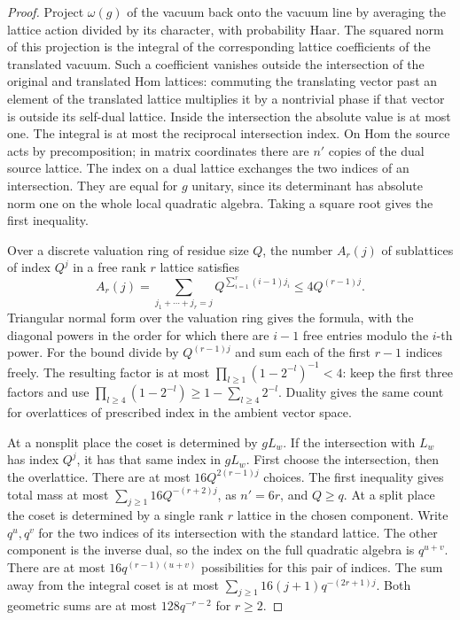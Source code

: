 \documentclass[a4paper,11pt]{article}
\theoremstyle{definition}
\theoremstyle{remark}
\numberwithin{equation}{section}
\begin{document}
\begin{proof}
Project \(\omega(g)\) of the vacuum back onto the vacuum line
by averaging the lattice action divided by its character,
with probability Haar. The squared norm of this projection
is the integral of the corresponding lattice coefficients
of the translated vacuum. Such a coefficient vanishes outside
the intersection of the original and translated Hom lattices:
commuting the translating vector past an element of the
translated lattice multiplies it by a nontrivial phase if
that vector is outside its self-dual lattice. Inside the
intersection the absolute value is at most one. The integral
is at most the reciprocal intersection index. On Hom the
source acts by precomposition; in matrix coordinates there
are \(n'\) copies of the dual source lattice. The index on a
dual lattice exchanges the two indices of an intersection.
They are equal for \(g\) unitary, since its determinant has
absolute norm one on the whole local quadratic algebra.
Taking a square root gives the first inequality.

Over a discrete valuation ring of residue size \(Q\), the
number \(A_r(j)\) of sublattices of index \(Q^j\) in a free
rank \(r\) lattice satisfies
\[
 A_r(j)=\!\sum_{j_1+\cdots+j_r=j} Q^{\sum_{i=1}^r(i-1)j_i}
       \le 4Q^{(r-1)j}.
\]
Triangular normal form over the valuation ring gives the
formula, with the diagonal powers in the order for which
there are \(i-1\) free entries modulo the \(i\)-th power.
For the bound divide by \(Q^{(r-1)j}\) and sum each of the
first \(r-1\) indices freely. The resulting factor is at most
\(\prod_{l\ge1}(1-2^{-l})^{-1}<4\): keep the first three
factors and use \(\prod_{l\ge4}(1-2^{-l})\ge1-\sum_{l\ge4}2^{-l}\).
Duality gives the same count for overlattices of prescribed
index in the ambient vector space.

At a nonsplit place the coset is determined by \(gL_w\).
If the intersection with \(L_w\) has index \(Q^j\), it
has that same index in \(gL_w\). First choose the intersection,
then the overlattice. There are at most \(16Q^{2(r-1)j}\)
choices. The first inequality gives total mass at most
\(\sum_{j\ge1}16Q^{-(r+2)j}\), as \(n'=6r\), and \(Q\ge q\).
At a split place the coset is determined by a single
rank \(r\) lattice in the chosen component. Write \(q^u,q^v\)
for the two indices of its intersection with the standard
lattice. The other component is the inverse dual, so the
index on the full quadratic algebra is \(q^{u+v}\).
There are at most \(16q^{(r-1)(u+v)}\) possibilities for
this pair of indices. The sum away from the integral coset
is at most
\(\sum_{j\ge1}16(j+1)q^{-(2r+1)j}\).
Both geometric sums are at most \(128q^{-r-2}\) for \(r\ge2\).
\end{proof}
\end{document}
